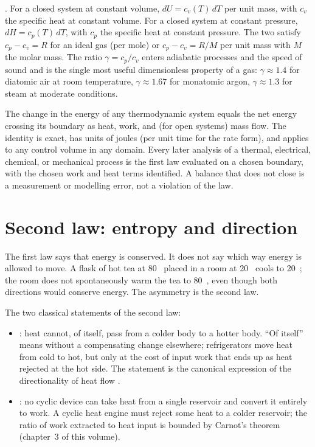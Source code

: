 . For a closed system at constant volume,
$dU = c_v(T) \,dT$ per unit mass, with $c_v$ the specific heat at
constant volume. For a closed system at constant pressure, $dH =
c_p(T) \,dT$, with $c_p$ the specific heat at constant pressure. The
two satisfy $c_p - c_v = R$ for an ideal gas (per mole) or $c_p -
c_v = R/M$ per unit mass with $M$ the molar mass. The ratio $\gamma =
c_p/c_v$ enters adiabatic processes and the speed of sound and is the
single most useful dimensionless property of a gas: $\gamma \approx
1.4$ for diatomic air at room temperature, $\gamma \approx 1.67$ for
monatomic argon, $\gamma \approx 1.3$ for steam at moderate
conditions.

\begin{principle}
The change in the energy of any thermodynamic system equals the net
energy crossing its boundary as heat, work, and (for open systems)
mass flow. The identity is exact, has units of joules (per unit time
for the rate form), and applies to any control volume in any domain.
Every later analysis of a thermal, electrical, chemical, or mechanical
process is the first law evaluated on a chosen boundary, with the
chosen work and heat terms identified. A balance that does not close
is a measurement or modelling error, not a violation of the law.
\end{principle}

\section{Second law: entropy and direction}

The first law says that energy is conserved. It does not say which way
energy is allowed to move. A flask of hot tea at 80~\degC{} placed in a
room at 20~\degC{} cools to 20~\degC{}; the room does not spontaneously
warm the tea to 80~\degC{}, even though both directions would conserve
energy. The asymmetry is the second law.

The two classical statements of the second law:

\begin{itemize}[leftmargin=*]
  \item {}: heat cannot, of itself, pass
    from a colder body to a hotter body. ``Of itself'' means without a
    compensating change elsewhere; refrigerators move heat from cold
    to hot, but only at the cost of input work that ends up as heat
    rejected at the hot side. The statement is the canonical
    expression of the directionality of heat flow
    \cite{hist:clausius1850}.
  \item {}: no cyclic device can take
    heat from a single reservoir and convert it entirely to work. A
    cyclic heat engine must reject some heat to a colder reservoir;
    the ratio of work extracted to heat input is bounded by Carnot's
    theorem (chapter~3 of this volume).
\end{itemize}

